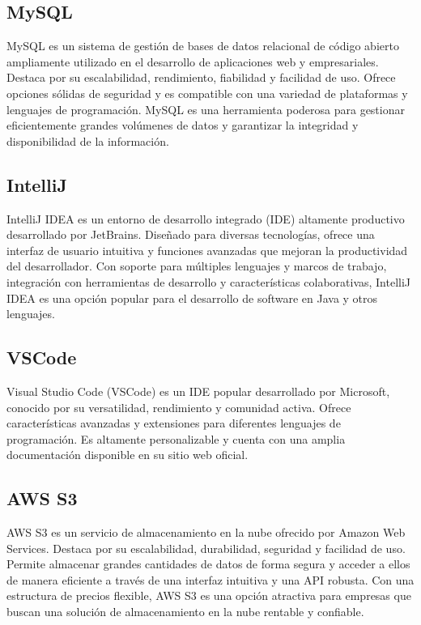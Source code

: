 \subsection{MySQL}
MySQL es un sistema de gestión de bases de datos relacional de código abierto ampliamente utilizado en el desarrollo de 
aplicaciones web y empresariales. Destaca por su escalabilidad, rendimiento, fiabilidad y facilidad de uso. Ofrece opciones 
sólidas de seguridad y es compatible con una variedad de plataformas y lenguajes de programación. MySQL es una herramienta poderosa 
para gestionar eficientemente grandes volúmenes de datos y garantizar la integridad y disponibilidad de la información.

\subsection{IntelliJ}
IntelliJ IDEA es un entorno de desarrollo integrado (IDE) altamente productivo desarrollado por JetBrains. 
Diseñado para diversas tecnologías, ofrece una interfaz de usuario intuitiva y funciones avanzadas que mejoran la 
productividad del desarrollador. Con soporte para múltiples lenguajes y marcos de trabajo, integración con herramientas de desarrollo y 
características colaborativas, IntelliJ IDEA es una opción popular para el desarrollo de software en Java y otros lenguajes.

\subsection{VSCode}
Visual Studio Code (VSCode) es un IDE popular desarrollado por Microsoft, conocido por su versatilidad, rendimiento y comunidad activa.
 Ofrece características avanzadas y extensiones para diferentes lenguajes de programación. Es altamente personalizable y cuenta con una 
 amplia documentación disponible en su sitio web oficial.

\subsection{AWS S3}
AWS S3 es un servicio de almacenamiento en la nube ofrecido por Amazon Web Services. Destaca por su escalabilidad, durabilidad, seguridad y 
facilidad de uso. Permite almacenar grandes cantidades de datos de forma segura y acceder a ellos de manera eficiente a través de una interfaz 
intuitiva y una API robusta. Con una estructura de precios flexible, AWS S3 es una opción atractiva para empresas que buscan una solución de 
almacenamiento en la nube rentable y confiable.

